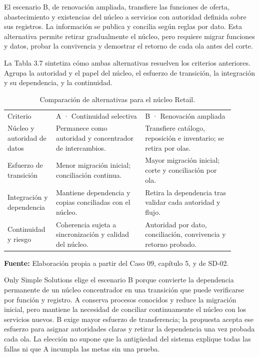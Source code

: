 \documentclass[11pt]{article}
\begin{document}
{El escenario B, de renovación ampliada, transfiere las funciones de oferta, abastecimiento y existencias del núcleo a servicios con autoridad definida sobre sus registros. La información se publica y concilia según reglas por dato. Esta alternativa permite retirar gradualmente el núcleo, pero requiere migrar funciones y datos, probar la convivencia y demostrar el retorno de cada ola antes del corte.}

{La Tabla 3.7 sintetiza cómo ambas alternativas resuelven los criterios anteriores. Agrupa la autoridad y el papel del núcleo, el esfuerzo de transición, la integración y su dependencia, y la continuidad.}

\begin{longtable}{@{}p{0.18\linewidth}p{0.36\linewidth}p{0.36\linewidth}@{}}
\caption{Comparación de alternativas para el núcleo Retail.}\label{tab:3-7}\\
\toprule\noalign{}
\endhead
\bottomrule\noalign{}
\endlastfoot
{Criterio} & {A · Continuidad selectiva} & {B · Renovación ampliada} \\
{Núcleo y autoridad de datos} & {Permanece como autoridad y concentrador de intercambios.} & {Transfiere catálogo, reposición e inventario; se retira por olas.} \\
{Esfuerzo de transición} & {Menor migración inicial; conciliación continua.} & {Mayor migración inicial; corte y conciliación por ola.} \\
{Integración y dependencia} & {Mantiene dependencia y copias conciliadas con el núcleo.} & {Retira la dependencia tras validar cada autoridad y flujo.} \\
{Continuidad y riesgo} & {Coherencia sujeta a sincronización y calidad del núcleo.} & {Autoridad por dato, conciliación, convivencia y retorno probado.} \\
\end{longtable}

{\raggedright\textbf{Fuente:} Elaboración propia a partir del Caso 09, capítulo 5, y de SD-02.\par}

{Only Simple Solutions elige el escenario B porque convierte la dependencia permanente de un núcleo concentrador en una transición que puede verificarse por función y registro. A conserva procesos conocidos y reduce la migración inicial, pero mantiene la necesidad de conciliar continuamente el núcleo con los servicios nuevos. B exige mayor esfuerzo de transferencia; la propuesta acepta ese esfuerzo para asignar autoridades claras y retirar la dependencia una vez probada cada ola. La elección no supone que la antigüedad del sistema explique todas las fallas ni que A incumpla las metas sin una prueba.}
\end{document}
